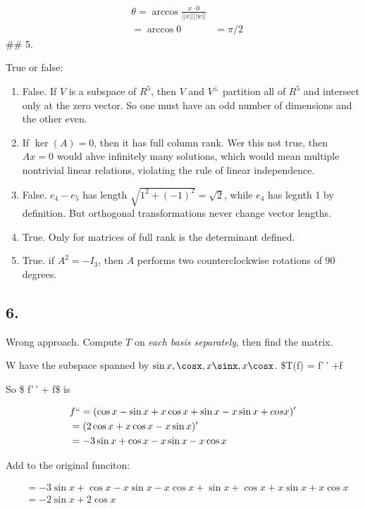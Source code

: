 \documentclass[
]{article}
\begin{document}
\[
  \begin{aligned}
    & \theta = \arccos \frac{x \cdot 0}{||x||||w||}\\
    & = \arccos 0
    & = \pi/2
  \end{aligned}
\] \#\# 5.

True or false:

\begin{enumerate}
\def\labelenumi{\alph{enumi}.}
\item
  False. If \(V\) is a subspace of \(R^5\), then \(V\) and \(V^{\perp}\)
  partition all of \(R^5\) and intersect only at the zero vector. So one
  must have an odd number of dimensions and the other even.
\item
  If \(\ker(A) = 0\), then it has full column rank. Wer this not true,
  then \(Ax=0\) would ahve infinitely many solutions, which would mean
  multiple nontrivial linear relations, violating the rule of linear
  independence.
\item
  False. \(e_4 - e_5\) has length \(\sqrt{1^2 + (-1)^2}=\sqrt{2}\),
  while \(e_4\) has legnth 1 by definition. But orthogonal
  transformations never change vector lengths.
\item
  True. Only for matrices of full rank is the determinant defined.
\item
  True. if \(A^2=-I_3\), then \(A\) performs two counterclockwise
  rotations of 90 degrees.
\end{enumerate}

\hypertarget{section-4}{%
\subsection{6.}\label{section-4}}

Wrong approach. Compute \(T\) on \emph{each basis separately}, then find
the matrix.

W have the subspace spanned by \(\sin x, \cosx, x\sinx, x\cosx\). \$T(f)
= f'\,' +f

So \$ f'\,' + f\$ is

\[
  \begin{aligned}
    & f`` = (\cos x - \sin x + x\cos x + \sin x -x\sin x + cos x)'\\
    & = (2 \cos x + x \cos x - x\sin x)'\\
    & = -3 \sin x + \cos x - x \sin x - x \cos x
  \end{aligned}
\]

Add to the original funciton:

\[
  \begin{aligned}
    & = -3 \sin x + \cos x - x \sin x - x \cos x + \sin x + \cos x + x\sin x + x \cos x\\
    & = -2 \sin x + 2 \cos x
  \end{aligned}
\]
\end{document}
